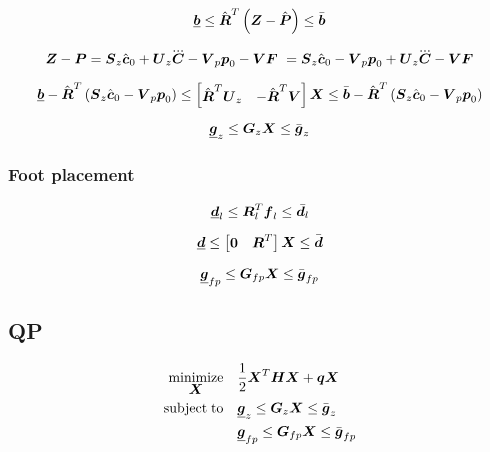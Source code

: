 \begin{equation*}
    \underline{\V{b}} 
    \le 
    \hat{\M{R}}^T
    \left(
        \ZMP
        -
        \FPh
    \right) 
    \le
    \bar{\V{b}}
\end{equation*}


\begin{equation*}
    \ZMP - \FP 
    =
    \M{S}_z \cstate_0  +  \M{U}_z \cJerk - \M{V}_p \fp_0 - \M{V} \FD\
    =
    \M{S}_z \cstate_0 - \M{V}_p \fp_0
    +
    \M{U}_z \cJerk - \M{V} \FD
\end{equation*}

\begin{equation*}
    \underline{\V{b}} 
    -
    \hat{\M{R}}^T
    \left(
        \M{S}_z \cstate_0 - \M{V}_p \fp_0
    \right)
    \le 
    \begin{bmatrix}
        \hat{\M{R}}^T \M{U}_z & - \hat{\M{R}}^T \M{V} \\
    \end{bmatrix}
    \V{X}
    \le
    \bar{\V{b}}
    -
    \hat{\M{R}}^T
    \left(
        \M{S}_z \cstate_0 - \M{V}_p \fp_0
    \right)
\end{equation*}

\begin{equation*}
    \underline{\V{g}}_z  \le  \M{G}_z \V{X}  \le  \bar{\V{g}}_z
\end{equation*}

\subsubsection{Foot placement}
\begin{equation*}
    \underline{\V{d}}_l \le \M{R}_l^T \fd_l \le \bar{\V{d}_l}
\end{equation*}

\begin{equation*}
    \underline{\V{d}} \le \begin{bmatrix} \M{0} & \M{R}^T \end{bmatrix} \V{X} \le \bar{\V{d}}
\end{equation*}

\begin{equation*}
    \underline{\V{g}}_{fp}  \le  \M{G}_{fp} \V{X}  \le  \bar{\V{g}}_{fp}
\end{equation*}




\subsection{QP}
\begin{equation*}
\begin{split}
    \minimize{\V{X}}    & \frac{1}{2} \V{X}^T\M{H}\V{X} + \V{q} \V{X}\\
    \subjectto          & \underline{\V{g}}_z  \le  \M{G}_z \V{X}  \le  \bar{\V{g}}_z\\
                        & \underline{\V{g}}_{fp}  \le  \M{G}_{fp} \V{X}  \le  \bar{\V{g}}_{fp}
\end{split}
\end{equation*}
